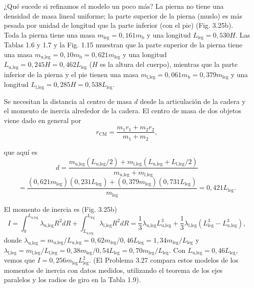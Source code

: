 \documentclass[12pt]{book}
\begin{document}
¿Qué sucede si refinamos el modelo un poco más? La pierna no tiene una densidad de masa lineal uniforme; la parte superior de la pierna (muslo) es más pesada por unidad de longitud que la parte inferior (con el pie) (Fig. 3.25b). Toda la pierna tiene una masa $m_{\text{leg}} = 0,161 m_{\text{b}}$ y una longitud $L_{\text{leg}} = 0,530 H$. Las Tablas 1.6 y 1.7 y la Fig. 1.15 muestran que la parte superior de la pierna tiene una masa $m_{\text{u,leg}} = 0,10 m_{\text{b}} = 0,621 m_{\text{leg}}$ y una longitud $L_{\text{u,leg}} = 0,245 H = 0,462 L_{\text{leg}}$ ($H$ es la altura del cuerpo), mientras que la parte inferior de la pierna y el pie tienen una masa $m_{\text{l,leg}} = 0,061 m_{\text{b}} = 0,379 m_{\text{leg}}$ y una longitud $L_{\text{l,leg}} = 0,285 H = 0,538 L_{\text{leg}}$.

Se necesitan la distancia al centro de masa $d$ desde la articulación de la cadera y el momento de inercia alrededor de la cadera. El centro de masa de dos objetos viene dado en general por
\begin{equation}
r_{\text{CM}} = \frac{m_1 r_1 + m_2 r_2}{m_1 + m_2},
\label{eq:3.31}
\end{equation}

que aquí es
\begin{equation}
d = \frac{m_{\text{u,leg}} (L_{\text{u,leg}}/2) + m_{\text{l,leg}} (L_{\text{u,leg}} + L_{\text{l,leg}}/2)}{m_{\text{u,leg}} + m_{\text{l,leg}}}
\label{eq:3.32}
\end{equation}
\begin{equation}
= \frac{(0,621 m_{\text{leg}}) (0,231 L_{\text{leg}}) + (0,379 m_{\text{leg}}) (0,731 L_{\text{leg}})}{m_{\text{leg}}} = 0,421 L_{\text{leg}}.
\label{eq:3.33}
\end{equation}

El momento de inercia es (Fig. 3.25b)
\begin{equation}
I = \int_{0}^{L_{\text{u,leg}}} \lambda_{\text{u,leg}} R^2 dR + \int_{L_{\text{u,leg}}}^{L_{\text{leg}}} \lambda_{\text{l,leg}} R^2 dR = \frac{1}{3} \lambda_{\text{u,leg}} L_{\text{u,leg}}^3 + \frac{1}{3} \lambda_{\text{l,leg}} (L_{\text{leg}}^3 - L_{\text{u,leg}}^3),
\label{eq:3.34}
\end{equation}
donde $\lambda_{\text{u,leg}} = m_{\text{u,leg}}/L_{\text{u,leg}} = 0,62 m_{\text{leg}}/0,46 L_{\text{leg}} = 1,34 m_{\text{leg}}/L_{\text{leg}}$ y $\lambda_{\text{l,leg}} = m_{\text{l,leg}}/L_{\text{l,leg}} = 0,38 m_{\text{leg}}/0,54 L_{\text{leg}} = 0,70 m_{\text{leg}}/L_{\text{leg}}$. Con $L_{\text{u,leg}} = 0,46 L_{\text{leg}}$, vemos que $I = 0,256 m_{\text{leg}} L_{\text{leg}}^2$. (El Problema 3.27 compara estos modelos de los momentos de inercia con datos medidos, utilizando el teorema de los ejes paralelos y los radios de giro en la Tabla 1.9).
\end{document}
